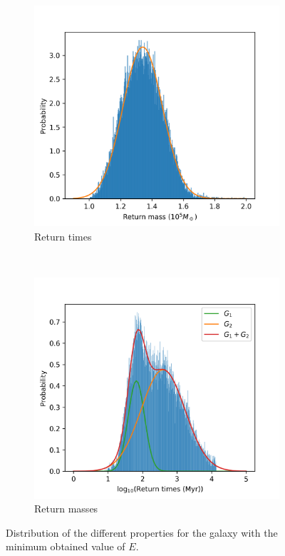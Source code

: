 	\begin{figure}[h]
		\centering
		\begin{subfigure}[t]{0.49\textwidth}
			\includegraphics[width = \textwidth]{"../Files/Week 13/dist_masses"}
			\caption{Return times}
		\end{subfigure}
		~ 
		\begin{subfigure}[t]{0.49\textwidth}
			\includegraphics[width=\textwidth]{"../Files/Week 13/dist_times"}
			\caption{Return masses}
		\end{subfigure}
		\caption{Distribution of the different properties for the galaxy with the minimum obtained value of $E$.}
	\end{figure}